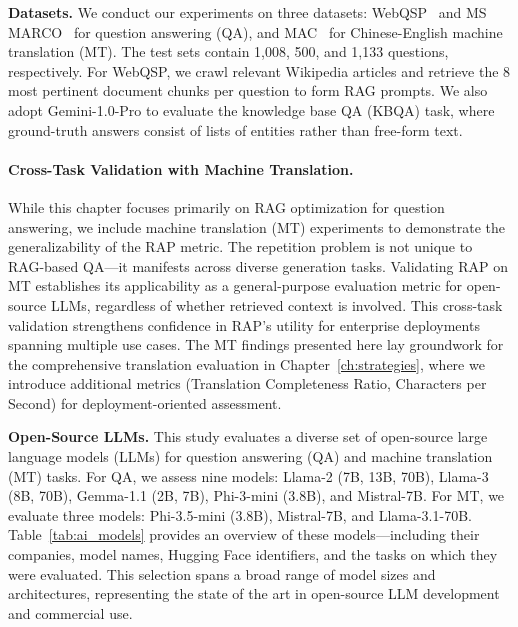 \textbf{Datasets.} We conduct our experiments on three datasets: WebQSP~\cite{yih2016webqsp} and MS MARCO~\cite{bajaj2016msmarco} for question answering (QA), and MAC~\cite{huang2025translation} for Chinese-English machine translation (MT). The test sets contain 1,008, 500, and 1,133 questions, respectively. For WebQSP, we crawl relevant Wikipedia articles and retrieve the 8 most pertinent document chunks per question to form RAG prompts. We also adopt Gemini-1.0-Pro to evaluate the knowledge base QA (KBQA) task, where ground-truth answers consist of lists of entities rather than free-form text.

\paragraph{Cross-Task Validation with Machine Translation.}
While this chapter focuses primarily on RAG optimization for question answering, we include machine translation (MT) experiments to demonstrate the generalizability of the RAP metric. The repetition problem is not unique to RAG-based QA---it manifests across diverse generation tasks. Validating RAP on MT establishes its applicability as a general-purpose evaluation metric for open-source LLMs, regardless of whether retrieved context is involved. This cross-task validation strengthens confidence in RAP's utility for enterprise deployments spanning multiple use cases. The MT findings presented here lay groundwork for the comprehensive translation evaluation in Chapter~\ref{ch:strategies}, where we introduce additional metrics (Translation Completeness Ratio, Characters per Second) for deployment-oriented assessment.

\textbf{Open-Source LLMs.} This study evaluates a diverse set of open-source large language models (LLMs) for question answering (QA) and machine translation (MT) tasks. For QA, we assess nine models: Llama-2 (7B, 13B, 70B), Llama-3 (8B, 70B), Gemma-1.1 (2B, 7B), Phi-3-mini (3.8B), and Mistral-7B. For MT, we evaluate three models: Phi-3.5-mini (3.8B), Mistral-7B, and Llama-3.1-70B. Table~\ref{tab:ai_models} provides an overview of these models---including their companies, model names, Hugging Face identifiers, and the tasks on which they were evaluated. This selection spans a broad range of model sizes and architectures, representing the state of the art in open-source LLM development and commercial use.


